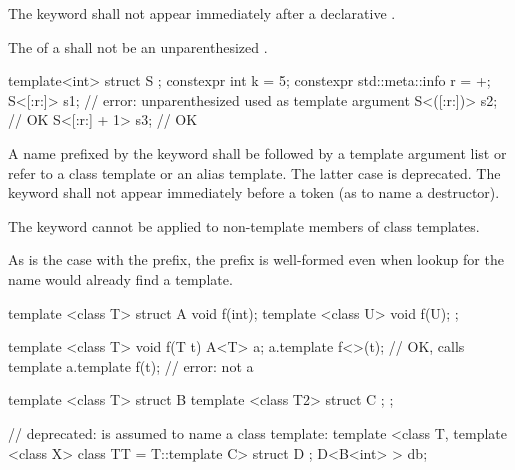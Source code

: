 \pnum
The keyword  shall not appear immediately after
a declarative .

\pnum
The  of a 
shall not be an unparenthesized .
\begin{example}
\begin{codeblock}
template<int> struct S { };
constexpr int k = 5;
constexpr std::meta::info r = ^^k;
S<[:r:]> s1;                        // error: unparenthesized  used as template argument
S<([:r:])> s2;                      // OK
S<[:r:] + 1> s3;                    // OK
\end{codeblock}
\end{example}

\pnum
A name prefixed by the keyword
shall be followed by a template argument list or
refer to a class template or an alias template.
The latter case is deprecated.
The keyword  shall not appear immediately
before a \tcode{\~} token (as to name a destructor).
\begin{note}
The keyword
cannot be applied to non-template members of class templates.
\end{note}
\begin{note}
As is the case with the
prefix, the
prefix is well-formed
even when lookup for the name would already find a template.
\end{note}
\begin{example}
\begin{codeblock}
template <class T> struct A {
  void f(int);
  template <class U> void f(U);
};

template <class T> void f(T t) {
  A<T> a;
  a.template f<>(t);                    // OK, calls template
  a.template f(t);                      // error: not a 
}

template <class T> struct B {
  template <class T2> struct C { };
};

// deprecated:  is assumed to name a class template:
template <class T, template <class X> class TT = T::template C> struct D { };
D<B<int> > db;
\end{codeblock}
\end{example}

